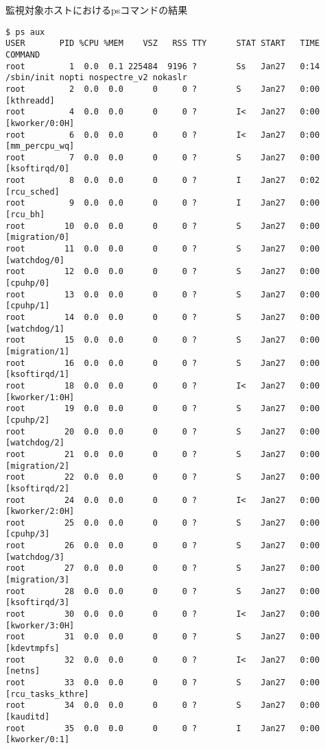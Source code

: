 \begin{itembox}[l]{監視対象ホストにおけるpsコマンドの結果}
    \begin{verbatim}
$ ps aux
USER       PID %CPU %MEM    VSZ   RSS TTY      STAT START   TIME COMMAND
root         1  0.0  0.1 225484  9196 ?        Ss   Jan27   0:14 /sbin/init nopti nospectre_v2 nokaslr
root         2  0.0  0.0      0     0 ?        S    Jan27   0:00 [kthreadd]
root         4  0.0  0.0      0     0 ?        I<   Jan27   0:00 [kworker/0:0H]
root         6  0.0  0.0      0     0 ?        I<   Jan27   0:00 [mm_percpu_wq]
root         7  0.0  0.0      0     0 ?        S    Jan27   0:00 [ksoftirqd/0]
root         8  0.0  0.0      0     0 ?        I    Jan27   0:02 [rcu_sched]
root         9  0.0  0.0      0     0 ?        I    Jan27   0:00 [rcu_bh]
root        10  0.0  0.0      0     0 ?        S    Jan27   0:00 [migration/0]
root        11  0.0  0.0      0     0 ?        S    Jan27   0:00 [watchdog/0]
root        12  0.0  0.0      0     0 ?        S    Jan27   0:00 [cpuhp/0]
root        13  0.0  0.0      0     0 ?        S    Jan27   0:00 [cpuhp/1]
root        14  0.0  0.0      0     0 ?        S    Jan27   0:00 [watchdog/1]
root        15  0.0  0.0      0     0 ?        S    Jan27   0:00 [migration/1]
root        16  0.0  0.0      0     0 ?        S    Jan27   0:00 [ksoftirqd/1]
root        18  0.0  0.0      0     0 ?        I<   Jan27   0:00 [kworker/1:0H]
root        19  0.0  0.0      0     0 ?        S    Jan27   0:00 [cpuhp/2]
root        20  0.0  0.0      0     0 ?        S    Jan27   0:00 [watchdog/2]
root        21  0.0  0.0      0     0 ?        S    Jan27   0:00 [migration/2]
root        22  0.0  0.0      0     0 ?        S    Jan27   0:00 [ksoftirqd/2]
root        24  0.0  0.0      0     0 ?        I<   Jan27   0:00 [kworker/2:0H]
root        25  0.0  0.0      0     0 ?        S    Jan27   0:00 [cpuhp/3]
root        26  0.0  0.0      0     0 ?        S    Jan27   0:00 [watchdog/3]
root        27  0.0  0.0      0     0 ?        S    Jan27   0:00 [migration/3]
root        28  0.0  0.0      0     0 ?        S    Jan27   0:00 [ksoftirqd/3]
root        30  0.0  0.0      0     0 ?        I<   Jan27   0:00 [kworker/3:0H]
root        31  0.0  0.0      0     0 ?        S    Jan27   0:00 [kdevtmpfs]
root        32  0.0  0.0      0     0 ?        I<   Jan27   0:00 [netns]
root        33  0.0  0.0      0     0 ?        S    Jan27   0:00 [rcu_tasks_kthre]
root        34  0.0  0.0      0     0 ?        S    Jan27   0:00 [kauditd]
root        35  0.0  0.0      0     0 ?        I    Jan27   0:00 [kworker/0:1]

\end{verbatim}
\end{itembox}
